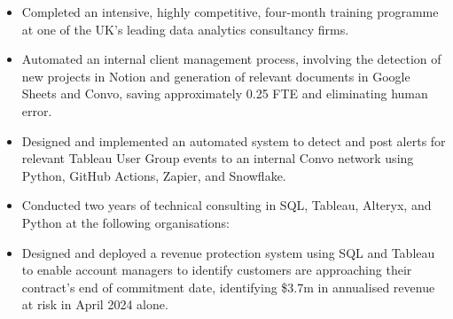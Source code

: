 \documentclass[10pt,a4paper,ragged2e,withhyper]{altacv}
\begin{document}

\makecvname



\begin{paracol}{2}

\begin{itemize}
\item Completed an intensive, highly competitive, four-month training programme at one of the UK’s leading data analytics consultancy firms.
\item Automated an internal client management process, involving the detection of new projects in Notion and generation of relevant documents in Google Sheets and Convo, saving approximately 0.25 FTE and eliminating human error.
\item Designed and implemented an automated system to detect and post alerts for relevant Tableau User Group events to an internal Convo network using Python, GitHub Actions, Zapier, and Snowflake.
\item Conducted two years of technical consulting in SQL, Tableau, Alteryx, and Python at the following organisations:

\medskip
{}

\end{itemize}

\divider

\begin{itemize}
\item Designed and deployed a revenue protection system using SQL and Tableau to enable account managers to identify customers are approaching their contract's end of commitment date, identifying \$3.7m in annualised revenue at risk in April 2024 alone.


\end{itemize}
\end{paracol}
\end{document}
